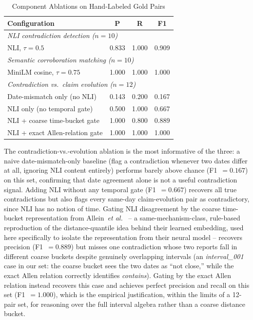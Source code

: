 \documentclass[conference]{IEEEtran}
\begin{document}
\begin{table}[htbp]
\caption{Component Ablations on Hand-Labeled Gold Pairs}
\label{tab:ablations}
\centering
\small
\begin{tabular}{lccc}
\toprule
\textbf{Configuration} & \textbf{P} & \textbf{R} & \textbf{F1} \\
\midrule
\multicolumn{4}{l}{\textit{NLI contradiction detection ($n=10$)}} \\
\quad NLI, $\tau{=}0.5$ & 0.833 & 1.000 & 0.909 \\
\midrule
\multicolumn{4}{l}{\textit{Semantic corroboration matching ($n=10$)}} \\
\quad MiniLM cosine, $\tau{=}0.75$ & 1.000 & 1.000 & 1.000 \\
\midrule
\multicolumn{4}{l}{\textit{Contradiction vs.\ claim evolution ($n=12$)}} \\
\quad Date-mismatch only (no NLI) & 0.143 & 0.200 & 0.167 \\
\quad NLI only (no temporal gate) & 0.500 & 1.000 & 0.667 \\
\quad NLI + coarse time-bucket gate~\cite{allein2023implicit} & 1.000 & 0.800 & 0.889 \\
\quad NLI + exact Allen-relation gate & 1.000 & 1.000 & 1.000 \\
\bottomrule
\end{tabular}
\end{table}

The contradiction-vs.-evolution ablation is the most informative of the
three: a naive date-mismatch-only baseline (flag a contradiction whenever
two dates differ at all, ignoring NLI content entirely) performs barely
above chance (F1~$=0.167$) on this set, confirming that date agreement
alone is not a useful contradiction signal. Adding NLI without any temporal
gate (F1~$=0.667$) recovers all true contradictions but also flags every
same-day claim-evolution pair as contradictory, since NLI has no notion of
time. Gating NLI disagreement by the coarse time-bucket representation from
Allein~\textit{et al.}~\cite{allein2023implicit} -- a same-mechanism-class,
rule-based reproduction of the distance-quantile idea behind their learned
embedding, used here specifically to isolate the representation from their
neural model -- recovers precision (F1~$=0.889$) but misses one contradiction
whose two reports fall in different coarse buckets despite genuinely
overlapping intervals (an \emph{interval\_001} case in our set: the coarse
bucket sees the two dates as ``not close,'' while the exact Allen relation
correctly identifies \emph{contains}). Gating by the exact Allen relation
instead recovers this case and achieves perfect precision and recall on
this set (F1~$=1.000$), which is the empirical justification, within the
limits of a 12-pair set, for reasoning over the full interval algebra
rather than a coarse distance bucket.
\end{document}
